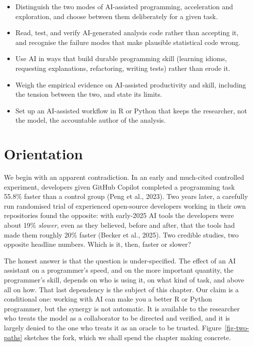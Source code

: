 \documentclass[
  letterpaper,
  11pt]{scrbook}
\providecommand{\tightlist}{%
  \setlength{\itemsep}{0pt}\setlength{\parskip}{0pt}}
\begin{document}
\begin{itemize}
\tightlist
\item
  Distinguish the two modes of AI-assisted programming, acceleration and
  exploration, and choose between them deliberately for a given task.
\item
  Read, test, and verify AI-generated analysis code rather than
  accepting it, and recognise the failure modes that make plausible
  statistical code wrong.
\item
  Use AI in ways that build durable programming skill (learning idioms,
  requesting explanations, refactoring, writing tests) rather than erode
  it.
\item
  Weigh the empirical evidence on AI-assisted productivity and skill,
  including the tension between the two, and state its limits.
\item
  Set up an AI-assisted workflow in R or Python that keeps the
  researcher, not the model, the accountable author of the analysis.
\end{itemize}

\section{Orientation}\label{orientation-3}

We begin with an apparent contradiction. In an early and much-cited
controlled experiment, developers given GitHub Copilot completed a
programming task 55.8\% faster than a control group (Peng et al., 2023).
Two years later, a carefully run randomised trial of experienced
open-source developers working in their own repositories found the
opposite: with early-2025 AI tools the developers were about 19\%
\emph{slower}, even as they believed, before and after, that the tools
had made them roughly 20\% faster (Becker et al., 2025). Two credible
studies, two opposite headline numbers. Which is it, then, faster or
slower?

The honest answer is that the question is under-specified. The effect of
an AI assistant on a programmer's speed, and on the more important
quantity, the programmer's skill, depends on who is using it, on what
kind of task, and above all on how. That last dependency is the subject
of this chapter. Our claim is a conditional one: working with AI can
make you a better R or Python programmer, but the synergy is not
automatic. It is available to the researcher who treats the model as a
collaborator to be directed and verified, and it is largely denied to
the one who treats it as an oracle to be trusted.
Figure~\ref{fig-two-paths} sketches the fork, which we shall spend the
chapter making concrete.
\end{document}
